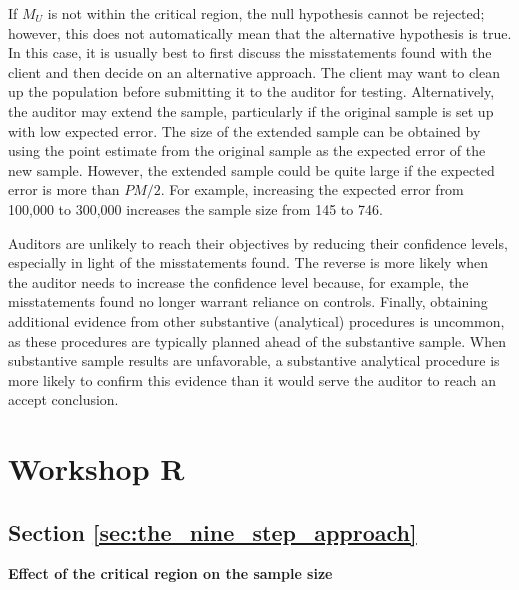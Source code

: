 If $M_U$ is not within the critical region, the null hypothesis cannot be rejected; however, this does not automatically mean that the alternative hypothesis is true. In this case, it is usually best to first discuss the misstatements found with the client and then decide on an alternative approach. The client may want to clean up the population before submitting it to the auditor for testing. Alternatively, the auditor may extend the sample, particularly if the original sample is set up with low expected error. The size of the extended sample can be obtained by using the point estimate from the original sample as the expected error of the new sample. However, the extended sample could be quite large if the expected error is more than $PM/2$. For example, increasing the expected error from 100,000 to 300,000 increases the sample size from 145 to 746.

Auditors are unlikely to reach their objectives by reducing their confidence levels, especially in light of the misstatements found. The reverse is more likely when the auditor needs to increase the confidence level because, for example, the misstatements found no longer warrant reliance on controls. Finally, obtaining additional evidence from other substantive (analytical) procedures is uncommon, as these procedures are typically planned ahead of the substantive sample. When substantive sample results are unfavorable, a substantive analytical procedure is more likely to confirm this evidence than it would serve the auditor to reach an accept conclusion.


\section{Workshop R} %
\label{sec:workshop05}

\subsection{Section \ref{sec:the_nine_step_approach}}

\begin{exercise}
\label{ex:critical_region}

\textbf{Effect of the critical region on the sample size}





\end{exercise}

